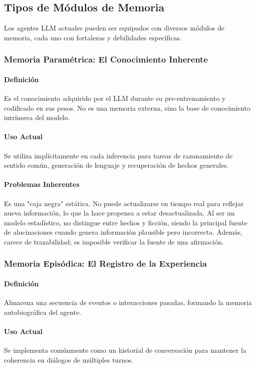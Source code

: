 \documentclass[journal,onecolumn]{IEEEtran}
\begin{document}
\subsection{Tipos de Módulos de Memoria}
Los agentes LLM actuales pueden ser equipados con diversos módulos de memoria, cada uno con fortalezas y debilidades específicas.

\subsubsection{Memoria Paramétrica: El Conocimiento Inherente}
\paragraph{Definición} Es el conocimiento adquirido por el LLM durante su pre-entrenamiento y codificado en sus pesos. No es una memoria externa, sino la base de conocimiento intrínseca del modelo.

\paragraph{Uso Actual} Se utiliza implícitamente en cada inferencia para tareas de razonamiento de sentido común, generación de lenguaje y recuperación de hechos generales.

\paragraph{Problemas Inherentes} Es una "caja negra" estática. No puede actualizarse en tiempo real para reflejar nueva información, lo que la hace propensa a estar desactualizada. Al ser un modelo estadístico, no distingue entre hechos y ficción, siendo la principal fuente de alucinaciones cuando genera información plausible pero incorrecta. Además, carece de trazabilidad; es imposible verificar la fuente de una afirmación.

\subsubsection{Memoria Episódica: El Registro de la Experiencia}
\paragraph{Definición} Almacena una secuencia de eventos o interacciones pasadas, formando la memoria autobiográfica del agente.

\paragraph{Uso Actual} Se implementa comúnmente como un historial de conversación para mantener la coherencia en diálogos de múltiples turnos.
\end{document}
